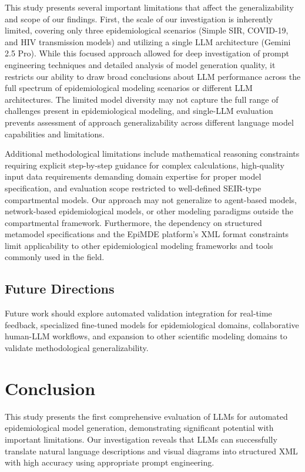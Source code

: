 \documentclass[conference]{IEEEtran}
\begin{document}
This study presents several important limitations that affect the generalizability and scope of our findings. First, the scale of our investigation is inherently limited, covering only three epidemiological scenarios (Simple SIR, COVID-19, and HIV transmission models) and utilizing a single LLM architecture (Gemini 2.5 Pro). While this focused approach allowed for deep investigation of prompt engineering techniques and detailed analysis of model generation quality, it restricts our ability to draw broad conclusions about LLM performance across the full spectrum of epidemiological modeling scenarios or different LLM architectures. The limited model diversity may not capture the full range of challenges present in epidemiological modeling, and single-LLM evaluation prevents assessment of approach generalizability across different language model capabilities and limitations.

Additional methodological limitations include mathematical reasoning constraints requiring explicit step-by-step guidance for complex calculations, high-quality input data requirements demanding domain expertise for proper model specification, and evaluation scope restricted to well-defined SEIR-type compartmental models. Our approach may not generalize to agent-based models, network-based epidemiological models, or other modeling paradigms outside the compartmental framework. Furthermore, the dependency on structured metamodel specifications and the EpiMDE platform's XML format constraints limit applicability to other epidemiological modeling frameworks and tools commonly used in the field.

\subsection{Future Directions}

Future work should explore automated validation integration for real-time feedback, specialized fine-tuned models for epidemiological domains, collaborative human-LLM workflows, and expansion to other scientific modeling domains to validate methodological generalizability.

\section{Conclusion}

This study presents the first comprehensive evaluation of LLMs for automated epidemiological model generation, demonstrating significant potential with important limitations. Our investigation reveals that LLMs can successfully translate natural language descriptions and visual diagrams into structured XML with high accuracy using appropriate prompt engineering.
\end{document}
